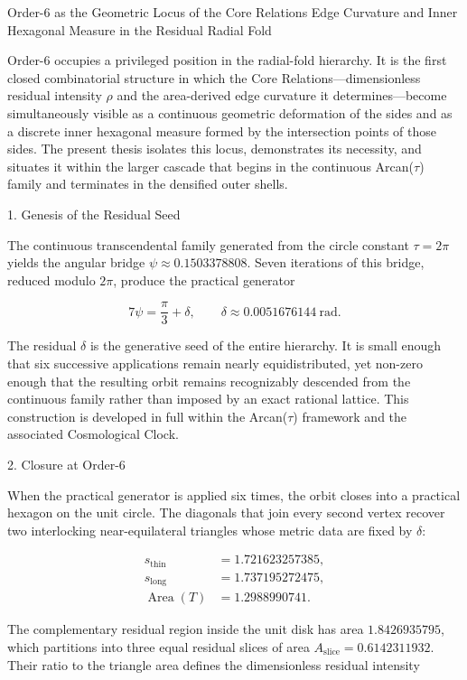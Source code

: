 Order-6 as the Geometric Locus of the Core Relations  
Edge Curvature and Inner Hexagonal Measure in the Residual Radial Fold

Order-6 occupies a privileged position in the radial-fold hierarchy. It is the first closed combinatorial structure in which the Core Relations—dimensionless residual intensity \(\rho\) and the area-derived edge curvature it determines—become simultaneously visible as a continuous geometric deformation of the sides and as a discrete inner hexagonal measure formed by the intersection points of those sides. The present thesis isolates this locus, demonstrates its necessity, and situates it within the larger cascade that begins in the continuous Arcan(\(\tau\)) family and terminates in the densified outer shells.

1. Genesis of the Residual Seed

The continuous transcendental family generated from the circle constant \(\tau=2\pi\) yields the angular bridge \(\psi\approx 0.1503378808\). Seven iterations of this bridge, reduced modulo \(2\pi\), produce the practical generator

\[
7\psi=\frac{\pi}{3}+\delta,\qquad\delta\approx 0.0051676144\ \mathrm{rad}.
\]

The residual \(\delta\) is the generative seed of the entire hierarchy. It is small enough that six successive applications remain nearly equidistributed, yet non-zero enough that the resulting orbit remains recognizably descended from the continuous family rather than imposed by an exact rational lattice. This construction is developed in full within the Arcan(\(\tau\)) framework and the associated Cosmological Clock.

2. Closure at Order-6

When the practical generator is applied six times, the orbit closes into a practical hexagon on the unit circle. The diagonals that join every second vertex recover two interlocking near-equilateral triangles whose metric data are fixed by \(\delta\):

\[
\begin{align*}
s_{\mathrm{thin}}&=1.721623257385,\\
s_{\mathrm{long}}&=1.737195272475,\\
\operatorname{Area}(T)&=1.2988990741.
\end{align*}
\]

The complementary residual region inside the unit disk has area \(1.8426935795\), which partitions into three equal residual slices of area \(A_{\mathrm{slice}}=0.6142311932\). Their ratio to the triangle area defines the dimensionless residual intensity

